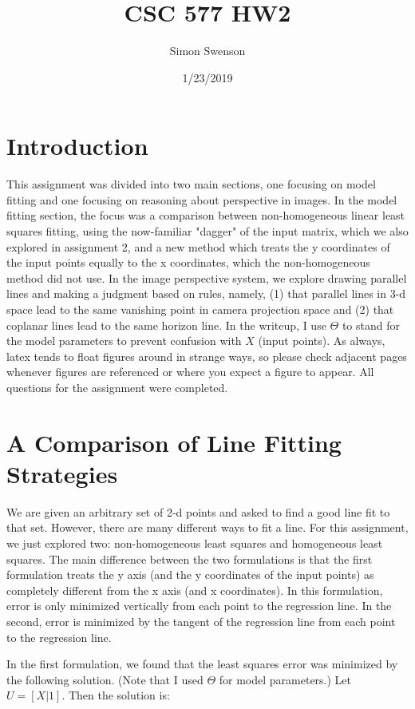 \documentclass{article}
\title{CSC 577 HW2}
\date{1/23/2019}
\author{Simon Swenson}
\begin{document}
\maketitle
{}

\section{Introduction}

This assignment was divided into two main sections, one focusing on model fitting 
and one focusing on reasoning about perspective in images. In the model fitting 
section, the focus was a comparison between non-homogeneous linear least squares 
fitting, using the now-familiar "dagger" of the input matrix, which we also explored 
in assignment 2, and a new method which treats the y coordinates of the input 
points equally to the x coordinates, which the non-homogeneous method did not 
use. In the image perspective system, we explore drawing parallel lines and 
making a judgment based on rules, namely, (1) that parallel lines in 3-d space 
lead to the same vanishing point in camera projection space and (2) that 
coplanar lines lead to the same horizon line. In the writeup, I use $\Theta$ to 
stand for the model parameters to prevent confusion with $X$ (input points). As 
always, latex tends to float figures around in strange ways, so please check 
adjacent pages whenever figures are referenced or where you expect a figure to 
appear. All questions for the assignment were completed.

\section{A Comparison of Line Fitting Strategies}

We are given an arbitrary set of 2-d points and asked to find a good line fit 
to that set. However, there are many different ways to fit a line. For this 
assignment, we just explored two: non-homogeneous least squares and 
homogeneous least squares. The main difference between the two formulations is 
that the first formulation treats the y axis (and the y coordinates of the input 
points) as completely different from the x axis (and x coordinates). In this 
formulation, error is only minimized vertically from each point to the regression 
line. In the second, error is minimized by the tangent of the regression line 
from each point to the regression line.

In the first formulation, we found that the least squares error was minimized 
by the following solution. (Note that I used $\Theta$ for model parameters.) Let 
$U = [X | 1]$. Then the solution is:
\end{document}

